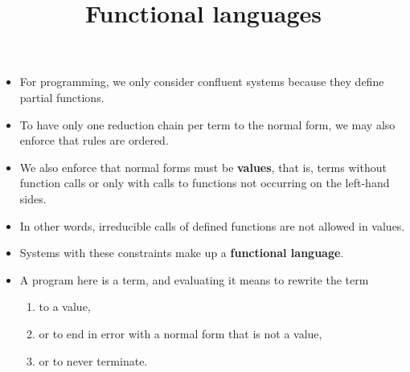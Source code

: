 \documentclass[wide]{slides}
\begin{document}
\begin{slide}
  \title{Functional languages}

  \begin{itemize}

    \item For programming, we only consider confluent systems because
      they define partial functions.

    \item To have only one reduction chain per term to the normal
      form, we may also enforce that rules are ordered.

    \item We also enforce that normal forms must be \textbf{values},
      that is, terms without function calls or only with calls to
      functions not occurring on the left\hyp{}hand sides.

    \item In other words, irreducible calls of defined functions are
      not allowed in values.

    \item Systems with these constraints make up a \textbf{functional
      language}.

    \item A program here is a term, and evaluating it means to rewrite
      the term
      \begin{enumerate}
        \item to a value,
        \item or to end in error with a normal form that is not a value,
        \item or to never terminate.
      \end{enumerate}

  \end{itemize}

\end{slide}
\end{document}
